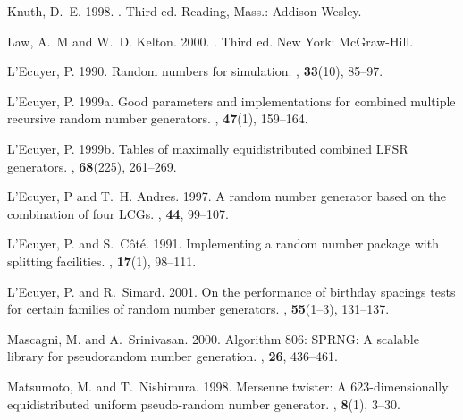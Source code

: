 \documentclass[12pt]{article}
\newenvironment {refer}{
  \begin {list}{}{
  \def\newblock {\hskip .11em plus .33em minus .07em}
  \setlength {\itemsep}{2pt}
  \setlength {\parsep}{0pt}
  \setlength {\parindent}{20pt}
  \setlength {\leftmargin}{+\parindent}
  \setlength {\itemindent}{-\parindent}}}{\end{list}}
\begin{document}
\begin{refer}

Knuth, D.~E. 1998.
.
\newblock Third ed. Reading, Mass.: Addison-Wesley.

Law, A.~M and W.~D. Kelton. 2000.
.
\newblock Third ed. New York: McGraw-Hill.

L'Ecuyer, P. 1990.
\newblock Random numbers for simulation.
,  {\bf 33}(10), 85--97.

L'Ecuyer, P. 1999a.
\newblock Good parameters and implementations for combined multiple recursive
  random number generators.
,  {\bf 47}(1), 159--164.

L'Ecuyer, P. 1999b.
\newblock Tables of maximally equidistributed combined {LFSR} generators.
,  {\bf 68}(225), 261--269.

L'Ecuyer, P and T.~H. Andres. 1997.
\newblock A random number generator based on the combination of four {LCG}s.
,  {\bf 44}, 99--107.

L'Ecuyer, P. and S.~C{\^o}t{\'e}. 1991.
\newblock Implementing a random number package with splitting facilities.
,  {\bf 17}(1),
  98--111.

L'Ecuyer, P. and R.~Simard. 2001.
\newblock On the performance of birthday spacings tests for certain families of
  random number generators.
,  {\bf 55}(1--3),
  131--137.

Mascagni, M. and A.~Srinivasan. 2000.
\newblock Algorithm 806: {SPRNG}: A scalable library for pseudorandom number
  generation.
,  {\bf 26},
  436--461.

Matsumoto, M. and T.~Nishimura. 1998.
\newblock Mersenne twister: A 623-dimensionally equidistributed uniform
  pseudo-random number generator.
,  {\bf
  8}(1), 3--30.

\end{refer}
\end{document}
